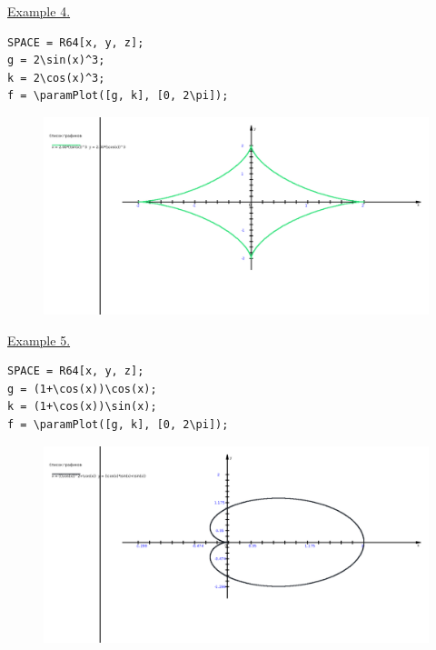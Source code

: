\eject
\underline{Example 4. }



\vspace*{-2mm}
\begin{verbatim}
SPACE = R64[x, y, z];
g = 2\sin(x)^3; 
k = 2\cos(x)^3;
f = \paramPlot([g, k], [0, 2\pi]);
\end{verbatim}
\vspace*{-2mm}


\begin{figure}[h!]
 \includegraphics[scale=0.3]{pictures/2_4}
\vspace*{-10mm}
\caption{}
\label{2_4}
\end{figure}



\underline{Example 5. }

\vspace*{-2mm}
\begin{verbatim}
SPACE = R64[x, y, z];
g = (1+\cos(x))\cos(x); 
k = (1+\cos(x))\sin(x);
f = \paramPlot([g, k], [0, 2\pi]);
\end{verbatim}
\vspace*{-2mm}

\begin{figure}[h!]
 \includegraphics[scale=0.3]{pictures/2_5}
\vspace*{-10mm}
\caption{}
\label{2_5}
\end{figure}

